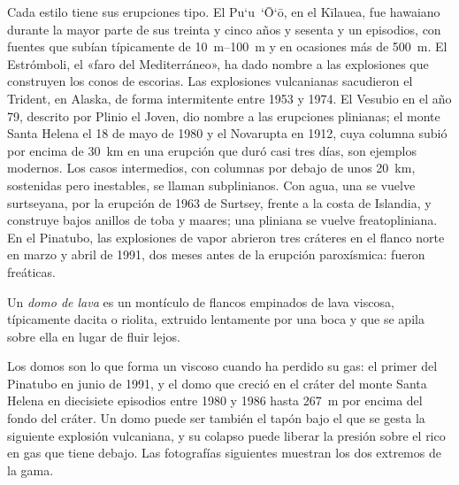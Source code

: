 Cada estilo tiene sus erupciones tipo. El Pu`u~`\=O`\=o, en el Kīlauea, fue hawaiano durante la mayor parte de
sus treinta y cinco años y sesenta y un episodios, con fuentes que subían típicamente de
\qtyrange{10}{100}{m} y en ocasiones más de \qty{500}{m}. El Estrómboli, el
«faro del Mediterráneo», ha dado nombre a las explosiones que construyen los
conos de escorias. Las explosiones vulcanianas sacudieron el Trident, en Alaska, de forma intermitente entre
1953 y 1974. El Vesubio en el año 79, descrito por Plinio el Joven, dio nombre a las
erupciones plinianas; el monte Santa Helena el 18 de mayo de 1980 y el Novarupta en 1912, cuya
columna subió por encima de \qty{30}{km} en una erupción que duró casi tres días, son
ejemplos modernos.
Los casos intermedios, con columnas por debajo de unos \qty{20}{km}, sostenidas pero inestables,
se llaman subplinianos. Con agua, una  se vuelve surtseyana,
por la erupción de 1963 de Surtsey, frente a la costa de Islandia, y construye bajos
anillos de toba y maares; una pliniana se vuelve freatopliniana. En el Pinatubo, las explosiones
de vapor abrieron tres cráteres en el flanco norte en marzo y abril de 1991, dos
meses antes de la erupción paroxísmica: fueron freáticas.

\begin{definition}\label{def:b2:eruptive-styles:dome}
Un \emph{domo de lava} es un montículo de flancos empinados de lava viscosa,
típicamente dacita o riolita, extruido lentamente por una boca y que se apila sobre ella
en lugar de fluir lejos.
\end{definition}

Los domos son lo que forma un  viscoso cuando ha perdido su gas: el primer
 del Pinatubo en junio de 1991, y el domo que creció en el cráter del monte Santa Helena en
diecisiete episodios entre 1980 y 1986 hasta \qty{267}{m} por encima del fondo del cráter.
Un domo puede ser también el tapón bajo el que se gesta la siguiente explosión vulcaniana,
y su colapso puede liberar la presión sobre el  rico en gas que tiene debajo. Las
fotografías siguientes muestran los dos extremos de la gama.

